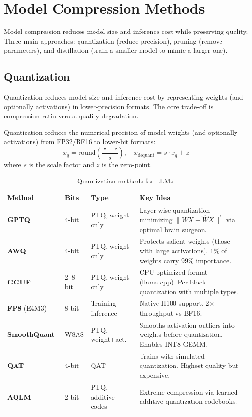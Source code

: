 \section{Model Compression Methods}
\label{model-compression-methods}

Model compression reduces model size and inference cost while preserving quality. Three main approaches: quantization (reduce precision), pruning (remove parameters), and distillation (train a smaller model to mimic a larger one).

\subsection{Quantization}
\label{quantization}

Quantization reduces model size and inference cost by representing weights (and optionally activations) in lower-precision formats. The core trade-off is compression ratio versus quality degradation.

\begin{keybox}
Quantization reduces the numerical precision of model weights (and optionally activations) from FP32/BF16 to lower-bit formats: 
\[
x_q = \text{round}\!\left(\frac{x - z}{s}\right), \quad x_{\text{dequant}} = s \cdot x_q + z
\]
 where $s$ is the scale factor and $z$ is the zero-point.
\end{keybox}

\begin{table}[ht!]
\centering
\caption{Quantization methods for LLMs.}
\begin{tabular}{@{}llll@{}}
\toprule
\textbf{Method} & \textbf{Bits} & \textbf{Type} & \textbf{Key Idea} \\
\midrule
\textbf{GPTQ}~\cite{frantar2023gptq} & 4-bit & PTQ, weight-only & \parbox[t]{5.5cm}{Layer-wise quantization minimizing $\|WX - \hat{W}X\|^2$ via optimal brain surgeon.} \\[4pt]
\textbf{AWQ}~\cite{lin2024awq} & 4-bit & PTQ, weight-only & \parbox[t]{5.5cm}{Protects salient weights (those with large activations). 1\% of weights carry 99\% importance.} \\[4pt]
\textbf{GGUF}~\cite{gerganov2023gguf} & 2--8 bit & PTQ, weight-only & \parbox[t]{5.5cm}{CPU-optimized format (llama.cpp). Per-block quantization with multiple types.} \\[4pt]
\textbf{FP8} (E4M3) & 8-bit & Training + inference & \parbox[t]{5.5cm}{Native H100 support. 2$\times$ throughput vs BF16.} \\[4pt]
\textbf{SmoothQuant}~\cite{xiao2023smoothquant} & W8A8 & PTQ, weight+act. & \parbox[t]{5.5cm}{Smooths activation outliers into weights before quantization. Enables INT8 GEMM.} \\[4pt]
\textbf{QAT}~\cite{liu2023llmqat} & 4-bit & QAT & \parbox[t]{5.5cm}{Trains with simulated quantization. Highest quality but expensive.} \\[4pt]
\textbf{AQLM}~\cite{egiazarian2024aqlm} & 2-bit & PTQ, additive codes & \parbox[t]{5.5cm}{Extreme compression via learned additive quantization codebooks.} \\
\bottomrule
\end{tabular}
\end{table}


